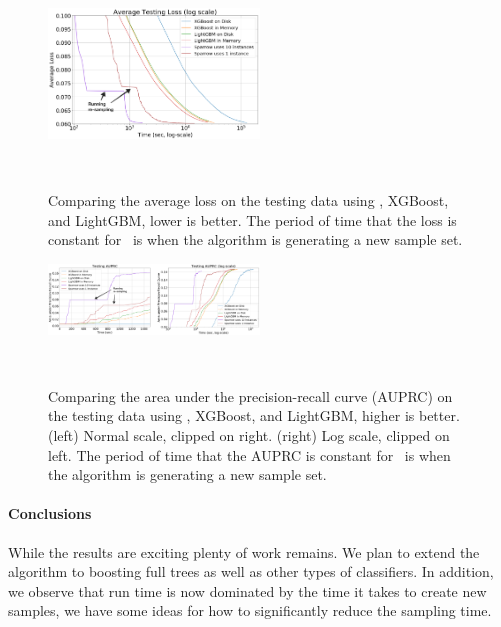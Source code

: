 \begin{figure}[t]
    \centering
    \includegraphics[width=0.5\textwidth]{splice-loss.png}
    \caption{Comparing the average loss on the testing data using \Sparrow, XGBoost, and LightGBM, lower is better.
        The period of time that the loss is constant for \Sparrow\ is when the algorithm is generating a new sample set.}~\label{fig:loss}
\end{figure}



\begin{figure}[t]
    \centering
    \includegraphics[width=0.5\textwidth]{splice-auprc.png}
    \caption{Comparing the area under the precision-recall curve (AUPRC) on the testing data
    using \Sparrow, XGBoost, and LightGBM, higher is better.
    (left) Normal scale, clipped on right.
    (right) Log scale, clipped on left.
    The period of time that the AUPRC is constant for \Sparrow\ is when the algorithm is generating a new sample set.}~\label{fig:auprc}
\end{figure}


\paragraph{Conclusions}
While the results are exciting plenty of work remains. We plan to
extend the algorithm to boosting full trees as well as other types of
classifiers.
In addition, we observe that run time is now dominated by the time it
takes to create new samples, we have some ideas for how to
significantly reduce the sampling time.





\iffalse

